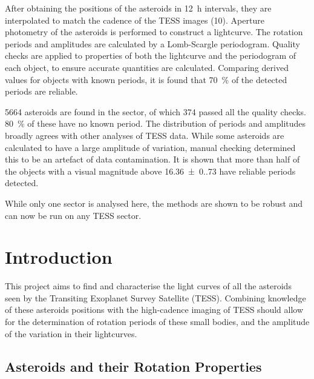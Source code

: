 \documentclass{UCreport}
\begin{document}
After obtaining the positions of the asteroids in \qty{12}{\hour} intervals, they are interpolated to match the cadence of the TESS images (\qty{10}{\min}).
Aperture photometry of the asteroids is performed to construct a lightcurve.
The rotation periods and amplitudes are calculated by a Lomb-Scargle periodogram.
Quality checks are applied to properties of both the lightcurve and the periodogram of each object, to ensure accurate quantities are calculated. 
Comparing derived values for objects with known periods, it is found that \qty{70}{\percent} of the detected periods are reliable.

5664 asteroids are found in the sector, of which 374 passed all the quality checks.
\qty{80}{\percent} of these have no known period. 
The distribution of periods and amplitudes broadly agrees with other analyses of TESS data.
While some asteroids are calculated to have a large amplitude of variation, manual checking determined this to be an artefact of data contamination.
It is shown that more than half of the objects with a visual magnitude above \qty{16.36(0.73)}{\mag} have reliable periods detected.

While only one sector is analysed here, the methods are shown to be robust and can now be run on any TESS sector. 

\newpage

\toc %

\listoffigures
\newpage
{}
\listoftables
\newpage


\section{Introduction}\label{Sec:Intro}

This project aims to find and characterise the light curves of all the asteroids seen by the Transiting Exoplanet Survey Satellite (TESS).
Combining knowledge of these asteroids positions with the high-cadence imaging of TESS should allow for the determination of rotation periods of these small bodies, and the amplitude of the variation in their lightcurves.


\subsection{Asteroids and their Rotation Properties}\label{SubSec:Asteroid}
\end{document}
